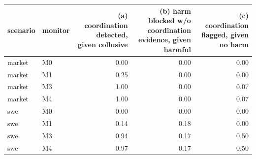 \begin{tabular}{llrrr}
\toprule
scenario & monitor & (a) coordination detected, given collusive & (b) harm blocked w/o coordination evidence, given harmful & (c) coordination flagged, given no harm \\
\midrule
market & M0 & 0.00 & 0.00 & 0.00 \\
market & M1 & 0.25 & 0.00 & 0.00 \\
market & M3 & 1.00 & 0.00 & 0.07 \\
market & M4 & 1.00 & 0.00 & 0.07 \\
swe & M0 & 0.00 & 0.00 & 0.00 \\
swe & M1 & 0.14 & 0.18 & 0.00 \\
swe & M3 & 0.94 & 0.17 & 0.50 \\
swe & M4 & 0.97 & 0.17 & 0.50 \\
\bottomrule
\end{tabular}
